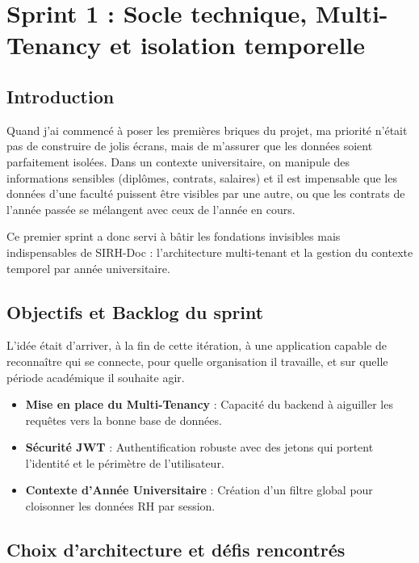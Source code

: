 
\chapter{Sprint 1 : Socle technique, Multi-Tenancy et isolation temporelle}

\section{Introduction}

Quand j'ai commencé à poser les premières briques du projet, ma priorité n'était pas de construire de jolis écrans, mais de m'assurer que les données soient parfaitement isolées. Dans un contexte universitaire, on manipule des informations sensibles (diplômes, contrats, salaires) et il est impensable que les données d'une faculté puissent être visibles par une autre, ou que les contrats de l'année passée se mélangent avec ceux de l'année en cours.

Ce premier sprint a donc servi à bâtir les fondations invisibles mais indispensables de SIRH-Doc : l'architecture multi-tenant et la gestion du contexte temporel par année universitaire.

\section{Objectifs et Backlog du sprint}

L'idée était d'arriver, à la fin de cette itération, à une application capable de reconnaître qui se connecte, pour quelle organisation il travaille, et sur quelle période académique il souhaite agir.

\begin{itemize}
    \item \textbf{Mise en place du Multi-Tenancy} : Capacité du backend à aiguiller les requêtes vers la bonne base de données.
    \item \textbf{Sécurité JWT} : Authentification robuste avec des jetons qui portent l'identité et le périmètre de l'utilisateur.
    \item \textbf{Contexte d'Année Universitaire} : Création d'un filtre global pour cloisonner les données RH par session.
\end{itemize}

\section{Choix d'architecture et défis rencontrés}


